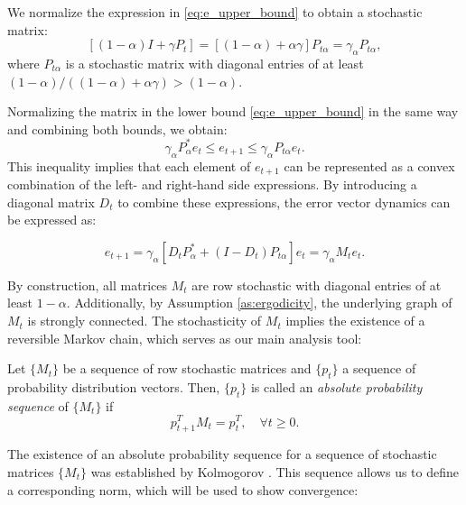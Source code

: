 \documentclass{article}
\begin{document}
We normalize the expression in \eqref{eq:e_upper_bound} to obtain a stochastic matrix:
\begin{equation*}
 \left[ (1-\alpha) I + \gamma P_t\right] = [(1-\alpha) + \alpha\gamma]P_{t\alpha} = \gamma_\alpha P_{t\alpha},
\end{equation*}
where $P_{t\alpha}$ is a stochastic matrix with diagonal entries of at least $(1-\alpha)/((1-\alpha) + \alpha\gamma) > (1-\alpha)$.

Normalizing the matrix in the lower bound \eqref{eq:e_upper_bound} in the same way and combining both bounds, we obtain:
\begin{equation} \label{eq:e_double_bound}
\gamma_\alpha P^*_\alpha e_t\le e_{t+1} \le \gamma_\alpha P_{t\alpha} e_t.
\end{equation}
This inequality implies that each element of $e_{t+1}$ can be represented as a convex combination of the left- and right-hand side expressions. By introducing a diagonal matrix $D_t$ to combine these expressions, the error vector dynamics can be expressed as:

\begin{equation} \label{eq:error_update}
e_{t+1} =\gamma_\alpha \left[ D_t P^*_\alpha + (I - D_t) P_{t\alpha} \right]  e_t=\gamma_\alpha M_t e_t.
\end{equation}

By construction, all matrices $M_t$ are row stochastic with diagonal entries of at least $1-\alpha$. Additionally, by Assumption \ref{as:ergodicity}, the underlying graph of $M_t$ is strongly connected. The stochasticity of $M_t$ implies the existence of a reversible Markov chain, which serves as our main analysis tool:

\begin{definition}
Let $\{M_t\}$ be a sequence of row stochastic matrices and $\{p_t \}$ a sequence of probability distribution vectors. Then, $\{p_t \}$ is called an \textit{absolute probability sequence} of $\{M_t\}$ if
\begin{equation} \label{eq:p_dynamics}
p_{t+1}^T M_t = p_t^T, \quad \forall t \geq 0.
\end{equation}
\end{definition}

The existence of an absolute probability sequence for a sequence of stochastic matrices $\{M_t\}$ was established by Kolmogorov \citep{kolmogoroff1936theorie}. This sequence allows us to define a corresponding norm, which will be used to show convergence:
\end{document}
